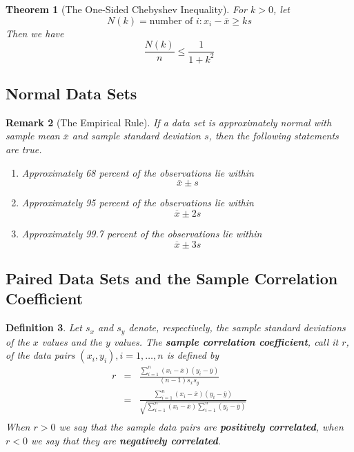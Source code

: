 \documentclass[12pt]{article}
\newtheorem{theorem}{Theorem}
\newtheorem{definition}[theorem]{Definition}
\newtheorem{remark}[theorem]{Remark}
\begin{document}
\begin{theorem}[The One-Sided Chebyshev Inequality]
  For $k>0$, let
  \begin{equation*}
    N(k) = \text{number of } i: x_i - \overline{x} \ge ks
  \end{equation*}
  Then we have
  \begin{equation*}
    \frac{N(k)}{n} \le \frac{1}{1+k^2}
  \end{equation*}
\end{theorem}

\subsection{Normal Data Sets}

\begin{remark} [The Empirical Rule]
  If a data set is approximately normal with sample mean $\overline{x}$ and sample standard deviation $s$, then the following statements are true.
  \begin{enumerate}
    \item Approximately 68 percent of the observations lie within
      \begin{equation*}
        \overline{x} \pm s
      \end{equation*}
    \item Approximately 95 percent of the observations lie within
      \begin{equation*}
        \overline{x} \pm 2s
      \end{equation*}
    \item Approximately 99.7 percent of the observations lie within
      \begin{equation*}
        \overline{x} \pm 3s
      \end{equation*}
  \end{enumerate}
\end{remark}

\subsection{Paired Data Sets and the Sample Correlation Coefficient}

\begin{definition}
  Let $s_x$ and $s_y$ denote, respectively, the sample standard deviations of the $x$ values and the $y$ values. The \textbf{sample correlation coefficient}, call it $r$, of the data pairs $(x_i,y_i),i=1,\dots,n$ is defined by
  \begin{eqnarray*}
    r
    &=& \frac {\sum_{i=1}^n (x_i - \overline{x})(y_i - \overline{y})}
    {(n-1) s_x s_y} \\
    &=& \frac {\sum_{i=1}^n (x_i - \overline{x})(y_i - \overline{y})}
    { \sqrt{\sum_{i=1}^n (x_i - \overline{x})
        \sum_{i=1}^n (y_i - \overline{y})} } \\
  \end{eqnarray*}
  When $r > 0$ we say that the sample data pairs are \textbf{positively correlated}, when $r<0$ we say that they are \textbf{negatively correlated}.
\end{definition}
\end{document}
